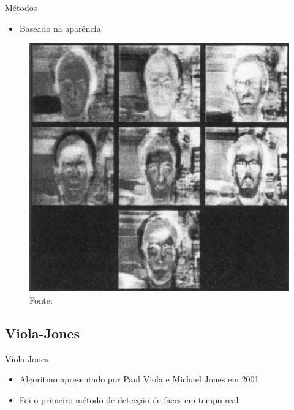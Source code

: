 \begin{frame}{Métodos}
\begin{itemize}
    \item Baseado na aparência
\end{itemize}

\begin{figure}
    \caption{Fonte: }
    \centering
    \includegraphics[height=0.6\textheight]{imagens/turk_eigenfaces.png}
\end{figure}
\end{frame}


\subsection{Viola-Jones}

\begin{frame}{Viola-Jones}
\begin{itemize}
    \item Algoritmo apresentado por Paul Viola e Michael Jones em 2001 \cite{Viola01rapidobject}
    \item Foi o primeiro método de detecção de faces em tempo real 
\end{itemize}
\end{frame}

